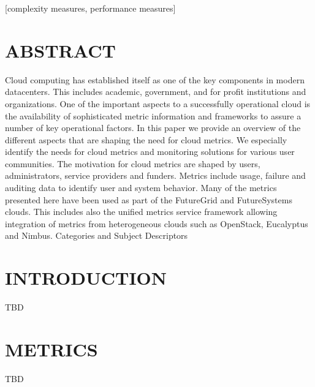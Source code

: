 \documentclass{sig-alternate}
\begin{document}
[complexity measures, performance measures] 
 




 



 

 
\section{ABSTRACT}

Cloud computing has established itself as one of the key components in modern datacenters. This includes academic, government, and for profit institutions and organizations. One of the important aspects to a successfully operational cloud is the availability of sophisticated metric information and frameworks to assure a number of key operational factors. In this paper we provide an overview of the different aspects that are shaping the need for cloud metrics. We especially identify the needs for cloud metrics and monitoring solutions for various user communities. The motivation for cloud metrics are shaped by users, administrators, service providers and funders. Metrics include usage, failure and auditing data to identify user and system behavior. Many of the metrics presented here have been used as part of the FutureGrid and FutureSystems clouds. This includes also the unified metrics service framework allowing integration of metrics from heterogeneous clouds such as OpenStack, Eucalyptus and Nimbus. 
Categories and Subject Descriptors



\section{INTRODUCTION}
TBD

\section{METRICS}
TBD
\end{document}
